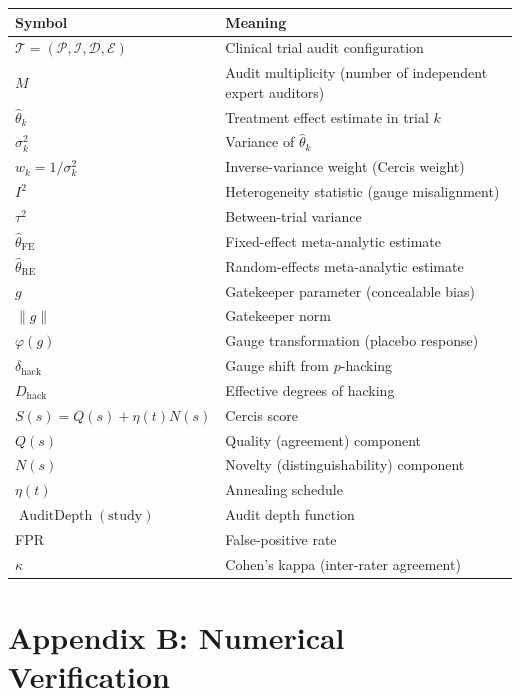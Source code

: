 \documentclass[12pt,a4paper]{article}
\theoremstyle{remark}
\DeclareMathOperator{\AuditDepth}{AuditDepth}
\begin{document}
\begin{table}[H]
\centering
\begin{tabular}{@{}ll@{}}
\toprule
\textbf{Symbol} & \textbf{Meaning} \\
\midrule
$\mathcal{T} = (\mathcal{P}, \mathcal{I}, \mathcal{D}, \mathcal{E})$ & Clinical trial audit configuration \\
$M$ & Audit multiplicity (number of independent expert auditors) \\
$\hat{\theta}_k$ & Treatment effect estimate in trial $k$ \\
$\sigma_k^2$ & Variance of $\hat{\theta}_k$ \\
$w_k = 1/\sigma_k^2$ & Inverse-variance weight (Cercis weight) \\
$I^2$ & Heterogeneity statistic (gauge misalignment) \\
$\tau^2$ & Between-trial variance \\
$\hat{\theta}_{\text{FE}}$ & Fixed-effect meta-analytic estimate \\
$\hat{\theta}_{\text{RE}}$ & Random-effects meta-analytic estimate \\
$g$ & Gatekeeper parameter (concealable bias) \\
$\|g\|$ & Gatekeeper norm \\
$\varphi(g)$ & Gauge transformation (placebo response) \\
$\delta_{\text{hack}}$ & Gauge shift from $p$-hacking \\
$D_{\text{hack}}$ & Effective degrees of hacking \\
$S(s) = Q(s) + \eta(t)N(s)$ & Cercis score \\
$Q(s)$ & Quality (agreement) component \\
$N(s)$ & Novelty (distinguishability) component \\
$\eta(t)$ & Annealing schedule \\
$\AuditDepth(\text{study})$ & Audit depth function \\
FPR & False-positive rate \\
$\kappa$ & Cohen's kappa (inter-rater agreement) \\
\bottomrule
\end{tabular}
\end{table}


\section*{Appendix B: Numerical Verification}
\label{app:numerical}
\end{document}
